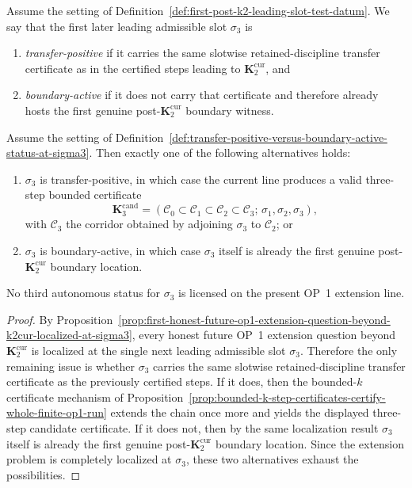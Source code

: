 \begin{definition}
\label{def:transfer-positive-versus-boundary-active-status-at-sigma3}
Assume the setting of Definition~\ref{def:first-post-k2-leading-slot-test-datum}. We say that the first later leading admissible slot $\sigma_3$ is
\begin{enumerate}[label=(\roman*)]
  \item \emph{transfer-positive} if it carries the same slotwise retained-discipline transfer certificate as in the certified steps leading to $\mathbf K_2^{\mathrm{cur}}$, and
  \item \emph{boundary-active} if it does not carry that certificate and therefore already hosts the first genuine post-$\mathbf K_2^{\mathrm{cur}}$ boundary witness.
\end{enumerate}
\end{definition}

\begin{proposition}
\label{prop:post-k2-slot-sigma3-admits-only-transfer-positive-or-boundary-active-status}
Assume the setting of Definition~\ref{def:transfer-positive-versus-boundary-active-status-at-sigma3}. Then exactly one of the following alternatives holds:
\begin{enumerate}[label=(\roman*)]
  \item $\sigma_3$ is transfer-positive, in which case the current line produces a valid three-step bounded certificate
  \[
    \mathbf K_3^{\mathrm{cand}}=(\mathcal C_0\subset \mathcal C_1\subset \mathcal C_2\subset \mathcal C_3;\,\sigma_1,\sigma_2,\sigma_3),
  \]
  with $\mathcal C_3$ the corridor obtained by adjoining $\sigma_3$ to $\mathcal C_2$; or
  \item $\sigma_3$ is boundary-active, in which case $\sigma_3$ itself is already the first genuine post-$\mathbf K_2^{\mathrm{cur}}$ boundary location.
\end{enumerate}
No third autonomous status for $\sigma_3$ is licensed on the present OP~1 extension line.
\end{proposition}

\begin{proof}
By Proposition~\ref{prop:first-honest-future-op1-extension-question-beyond-k2cur-localized-at-sigma3}, every honest future OP~1 extension question beyond $\mathbf K_2^{\mathrm{cur}}$ is localized at the single next leading admissible slot $\sigma_3$. Therefore the only remaining issue is whether $\sigma_3$ carries the same slotwise retained-discipline transfer certificate as the previously certified steps. If it does, then the bounded-$k$ certificate mechanism of Proposition~\ref{prop:bounded-k-step-certificates-certify-whole-finite-op1-run} extends the chain once more and yields the displayed three-step candidate certificate. If it does not, then by the same localization result $\sigma_3$ itself is already the first genuine post-$\mathbf K_2^{\mathrm{cur}}$ boundary location. Since the extension problem is completely localized at $\sigma_3$, these two alternatives exhaust the possibilities.
\end{proof}

